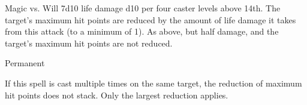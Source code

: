 \begin{spellheader}
\end{spellheader}
\begin{spellcontent}
    \begin{spelltargetinginfo}
    \end{spelltargetinginfo}
    \begin{spelleffects}
        \begin{spellattack}{Magic vs. Will}
            \spellsuccess 7d10 life damage \add d10 per four caster levels above 14th. The target's maximum hit points are reduced by the amount of life damage it takes from this attack (to a minimum of 1).
            \spellfailure As above, but half damage, and the target's maximum hit points are not reduced.
        \end{spellattack}
        \spelldur Permanent
    \end{spelleffects}
\end{spellcontent}
\begin{spellfooter}
    \spellnotes If this spell is cast multiple times on the same target, the reduction of maximum hit points does not stack. Only the largest reduction applies.

    \cursespellnotes
\end{spellfooter}

